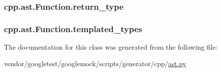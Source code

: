 \subsubsection[{\texorpdfstring{return\+\_\+type}{return_type}}]{\setlength{\rightskip}{0pt plus 5cm}cpp.\+ast.\+Function.\+return\+\_\+type}\hypertarget{classcpp_1_1ast_1_1Function_af750fd788d7ab33163ee066534780212}{}\label{classcpp_1_1ast_1_1Function_af750fd788d7ab33163ee066534780212}
\subsubsection[{\texorpdfstring{templated\+\_\+types}{templated_types}}]{\setlength{\rightskip}{0pt plus 5cm}cpp.\+ast.\+Function.\+templated\+\_\+types}\hypertarget{classcpp_1_1ast_1_1Function_a57bb03218bade3240137a0d91c467cb6}{}\label{classcpp_1_1ast_1_1Function_a57bb03218bade3240137a0d91c467cb6}


The documentation for this class was generated from the following file\+:\begin{DoxyCompactItemize}
\item 
vendor/googletest/googlemock/scripts/generator/cpp/\hyperlink{ast_8py}{ast.\+py}\end{DoxyCompactItemize}
